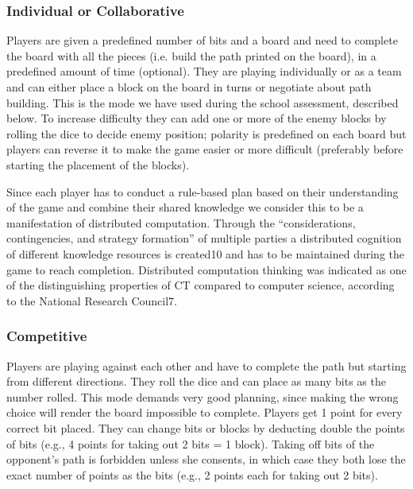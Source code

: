 \documentclass{acm_proc_article-sp}
\begin{document}
\subsubsection{Individual or Collaborative}
Players are given a predefined number of bits and a board and need to complete the board with all the pieces (i.e. build the path printed on the board), in a predefined amount of time (optional). They are playing individually or as a team and can either place a block on the board in turns or negotiate about path building. This is the mode we have used during the school assessment, described below. To increase difficulty they can add one or more of the enemy blocks by rolling the dice to decide enemy position; polarity is predefined on each board but players can reverse it to make the game easier or more difficult (preferably before starting the placement of the blocks).

Since each player has to conduct a rule-based plan based on their understanding of the game and combine their shared knowledge we consider this to be a manifestation of distributed computation. Through the “considerations, contingencies, and strategy formation” of multiple parties a distributed cognition of different knowledge resources is created10 and has to be maintained during the game to reach completion. Distributed computation thinking was indicated as one of the distinguishing properties of CT compared to computer science, according to the National Research Council7.

\subsubsection{Competitive}
Players are playing against each other and have to complete the path but starting from different directions. They roll the dice and can place as many bits as the number rolled. This mode demands very good planning, since making the wrong choice will render the board impossible to complete. Players get 1 point for every correct bit placed. They can change bits or blocks by deducting double the points of bits (e.g., 4 points for taking out 2 bits = 1 block). Taking off bits of the opponent’s path is forbidden unless she consents, in which case they both lose the exact number of points as the bits (e.g., 2 points each for taking out 2 bits).
\end{document}
